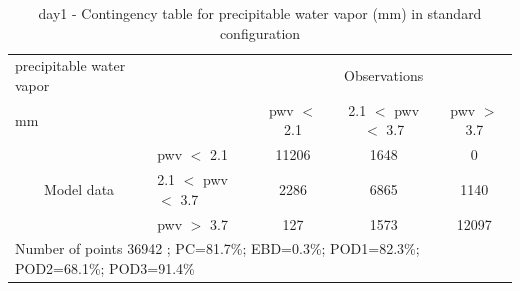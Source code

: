 \begin{table}[p!]
\begin{center}
\begin{tabular}{llccc}
\hline
{precipitable water vapor}                                       &                                                    & \multicolumn{3}{c}{Observations}                 \\
{mm}                                       &                             & pwv $<$ 2.1   & 2.1 $<$ pwv $<$ 3.7 & pwv $>$ 3.7 \\
\hline
\multicolumn{1}{c}{\multirow{3}{*}{Model data}}  & pwv $<$ 2.1             & 11206                & 1648                       & 0              \\
                                                 & 2.1  $<$ pwv $<$ 3.7 & 2286                & 6865                       & 1140              \\
                                                 & pwv $>$ 3.7             & 127                & 1573                       & 12097              \\
\hline
\multicolumn{5}{l}{ Number of points        36942 ; PC=81.7\%; EBD=0.3\%; POD1=82.3\%; POD2=68.1\%; POD3=91.4\%}                 \\
\end{tabular}
\end{center}
\caption{day1 - Contingency table for  precipitable water vapor (mm) in standard configuration  }
\label{tab:contingencypwvBEF:day1}
\end{table}
